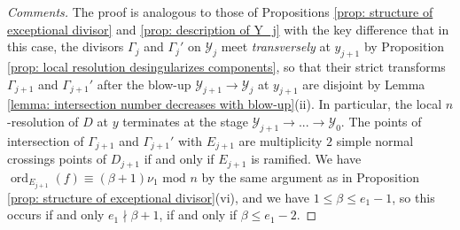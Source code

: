 \documentclass[12pt]{amsart}
\numberwithin{equation}{section}
\theoremstyle{definition}
\newcommand{\Y}{\mathcal{Y}}
\newcommand{\tx}[1]{\text{#1}}
\DeclareMathOperator{\ord}{ord}
\begin{document}
\begin{proof}[Comments]
    The proof is analogous to those of Propositions \ref{prop: structure of exceptional divisor} and \ref{prop: description of Y_j} with the key difference that in this case, the divisors $\Gamma_j$ and $\Gamma_j'$ on $\Y_j$ meet \textit{transversely} at $y_{j+1}$ by Proposition \ref{prop: local resolution desingularizes components}, so that their strict transforms $\Gamma_{j+1}$ and $\Gamma_{j+1}'$ after the blow-up $\Y_{j+1}\to\Y_j$ at $y_{j+1}$ are disjoint by Lemma \ref{lemma: intersection number decreases with blow-up}(ii). In particular, the local $n$-resolution of $D$ at $y$ terminates at the stage $\Y_{j+1}\to...\to\Y_0$. The points of intersection of $\Gamma_{j+1}$ and $\Gamma_{j+1}'$ with $E_{j+1}$ are multiplicity $2$ simple normal crossings points of $D_{j+1}$ if and only if $E_{j+1}$ is ramified. We have $\ord_{E_{j+1}}(f)\equiv(\beta+1)\nu_1\tx{ mod }n$ by the same argument as in Proposition \ref{prop: structure of exceptional divisor}(vi), and we have $1\leq\beta\leq e_1-1$, so this occurs if and only $e_1\nmid \beta+1$, if and only if $\beta\leq e_1-2$.
\end{proof}
\end{document}
